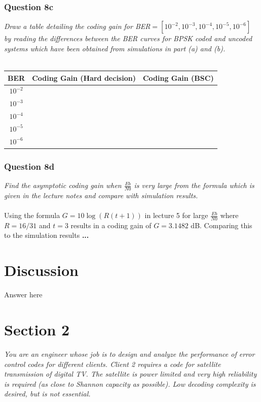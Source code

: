 \documentclass[a4paper]{article}
\begin{document}
\subsubsection{Question 8c} \textit{Draw a table detailing the coding gain for BER$= [10^{−2}, 10^{−3}, 10^{−4} , 10^{−5} , 10^{−6} ]$ by reading the differences between the BER curves for BPSK coded and uncoded systems which have been obtained from simulations in part (a) and (b).} \\
\\
\begin{tabular}{| c | c | c |}
\hline
BER & Coding Gain (Hard decision) & Coding Gain (BSC) \\
\hline
$10^{-2}$ & & \\
\hline
$10^{-3}$ & & \\
\hline
$10^{-4}$ & & \\
\hline
$10^{-5}$ & & \\
\hline
$10^{-6}$ & & \\
\hline
\end{tabular}

\subsubsection{Question 8d} \textit{Find the asymptotic coding gain when $\frac{Eb}{N0}$ is very large from the formula which is given in the lecture notes and compare with simulation results.} \\
\\
Using the formula $G = 10\log(R(t+1))$ in lecture 5 for large $\frac{Eb}{N0}$ where $R = 16/31$ and $t = 3$ results in a coding gain of $G = 3.1482$ dB. Comparing this to the simulation results \textbf{...} \\

\section{Discussion}

Answer here \\


\hrulefill
\newpage

\section{Section 2}

\textit{You are an engineer whose job is to design and analyze the performance of error control codes for different clients. Client 2 requires a code for satellite transmission of digital TV. The satellite is power limited and very high reliability is required (as close to Shannon capacity as possible). Low decoding complexity is desired, but is not essential.} \\
\\
\end{document}
